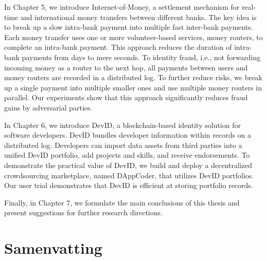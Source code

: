 In Chapter 5, we introduce Internet-of-Money, a settlement mechanism for real-time and international money transfers between different banks.
The key idea is to break up a slow intra-bank payment into multiple fast inter-bank payments.
Each money transfer uses one or more volunteer-based services, money routers, to complete an intra-bank payment.
This approach reduces the duration of intra-bank payments from days to mere seconds.
To identity fraud, i.e., not forwarding incoming money as a router to the next hop, all payments between users and money routers are recorded in a distributed log.
To further reduce risks, we break up a single payment into multiple smaller ones and use multiple money routers in parallel.
Our experiments show that this approach significantly reduces fraud gains by adversarial parties.

In Chapter 6, we introduce DevID, a blockchain-based identity solution for software developers.
DevID bundles developer information within records on a distributed log.
Developers can import data assets from third parties into a unified DevID portfolio, add projects and skills, and receive endorsements.
To demonstrate the practical value of DevID, we build and deploy a decentralized crowdsourcing marketplace, named DAppCoder, that utilizes DevID portfolios.
Our user trial demonstrates that DevID is efficient at storing portfolio records.

Finally, in Chapter 7, we formulate the main conclusions of this thesis and present suggestions for further research directions.

\chapter*{Samenvatting}

{

\todo{}
}




